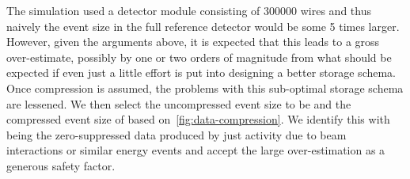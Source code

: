 The simulation used a detector module consisting of \num{300000} wires and
thus naively the event size in the full reference detector would be some 5 times
larger.
However, given the arguments above, it is expected that this leads to
a gross over-estimate, possibly by one or two orders of magnitude from
what should be expected if even just a little effort is put into
designing a better storage schema.
Once compression is assumed, the problems with this sub-optimal
storage schema are lessened.
We then select the uncompressed event size to be \beameventsize and
the compressed event size of \beameventsizecompressed based
on~\ref{fig:data-compression}.
We identify this with being the zero-suppressed data produced by just
activity due to beam interactions or similar energy events and accept
the large over-estimation as a generous safety factor.






